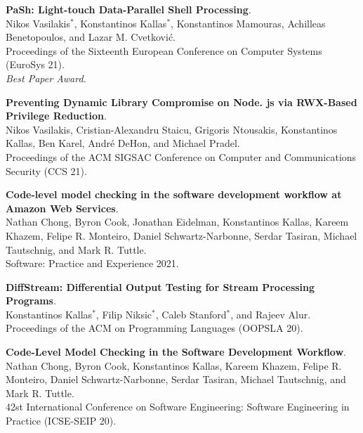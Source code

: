 \begin{minipage}{\textwidth}
\textbf{PaSh: Light-touch Data-Parallel Shell Processing}. \\
Nikos Vasilakis$^*$, Konstantinos Kallas$^*$, Konstantinos Mamouras, Achilleas Benetopoulos, and Lazar M. Cvetković. \\
Proceedings of the Sixteenth European Conference on Computer Systems (EuroSys 21).\\
 \emph{Best Paper Award.}
\end{minipage}

\begin{minipage}{\textwidth}
\textbf{Preventing Dynamic Library Compromise on Node. js via RWX-Based Privilege Reduction}. \\
Nikos Vasilakis, Cristian-Alexandru Staicu, Grigoris Ntousakis, Konstantinos Kallas, Ben Karel, André DeHon, and Michael Pradel. \\
Proceedings of the ACM SIGSAC Conference on Computer and Communications Security (CCS 21).
\end{minipage}

\begin{minipage}{\textwidth}
\textbf{Code-level model checking in the software development workflow at Amazon Web Services}. \\
Nathan Chong, Byron Cook, Jonathan Eidelman, Konstantinos Kallas, Kareem Khazem, Felipe R. Monteiro, Daniel Schwartz-Narbonne, Serdar Tasiran, Michael Tautschnig, and Mark R. Tuttle. \\
Software: Practice and Experience 2021.
\end{minipage}

\begin{minipage}{\textwidth}
\textbf{DiffStream: Differential Output Testing for Stream Processing Programs}. \\
Konstantinos Kallas$^*$, Filip Niksic$^*$, Caleb Stanford$^*$, and Rajeev Alur. \\
Proceedings of the ACM on Programming Languages (OOPSLA 20).
\end{minipage}

\begin{minipage}{\textwidth}
\textbf{Code-Level Model Checking in the Software Development Workflow}. \\
Nathan Chong, Byron Cook, Konstantinos Kallas, Kareem Khazem, Felipe R. Monteiro, Daniel Schwartz-Narbonne, Serdar Tasiran, Michael Tautschnig, and Mark R. Tuttle. \\
42st International Conference on Software Engineering: Software Engineering in Practice (ICSE-SEIP 20).
\end{minipage}

